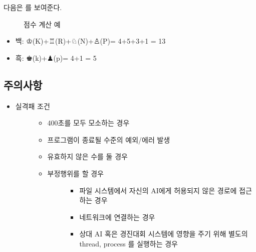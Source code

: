 \documentclass[letterpaper,10pt,english]{sphinxmanual}
\begin{document}
다음은 {\hyperref[\detokenize{01-microchess_ai_competition:score-example}]{}} 를 보여준다.

\begin{figure}[htbp]
\centering
\capstart

\noindent{}
\caption{점수 계산 예}\label{\detokenize{01-microchess_ai_competition:score-example}}\label{\detokenize{01-microchess_ai_competition:id16}}\end{figure}
\begin{itemize}
\item {} 
백: ♔(K)+♖(R)+♘(N)+♙(P)= 4+5+3+1 = 13

\item {} 
흑: ♚(k)+♟(p)= 4+1 = 5

\end{itemize}


\subsection{주의사항}
\label{\detokenize{01-microchess_ai_competition:id6}}\begin{itemize}
\item {} \begin{description}
\item[{실격패 조건}] \leavevmode\begin{itemize}
\item {} 
400초를 모두 모소하는 경우

\item {} 
프로그램이 종료될 수준의 예외/에러 발생

\item {} 
유효하지 않은 수를 둘 경우

\item {} \begin{description}
\item[{부정행위를 할 경우}] \leavevmode\begin{itemize}
\item {} 
파일 시스템에서 자신의 AI에게 허용되지 않은 경로에 접근하는 경우

\item {} 
네트워크에 연결하는 경우

\item {} 
상대 AI 혹은 경진대회 시스템에 영향을 주기 위해 별도의 thread, process 를 실행하는 경우

\end{itemize}

\end{description}

\end{itemize}

\end{description}

\end{itemize}
\end{document}
